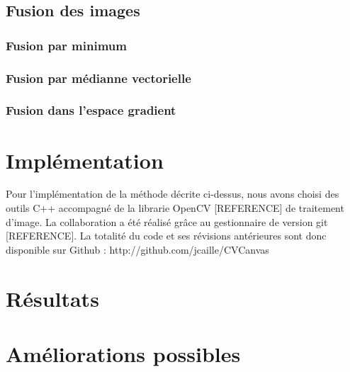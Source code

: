 \documentclass[12pt,a4paper]{article}
\begin{document}
\subsection{Fusion des images}

\subsubsection{Fusion par minimum}

\subsubsection{Fusion par médianne vectorielle}

\subsubsection{Fusion dans l'espace gradient}

\section{Implémentation}

Pour l'implémentation de la méthode décrite ci-dessus, nous avons choisi des outils C++ accompagné de la librarie OpenCV [REFERENCE] de traitement d'image. La collaboration a été réalisé grâce au gestionnaire de version git [REFERENCE]. La totalité du code et ses révisions antérieures sont donc disponible sur Github : http://github.com/jcaille/CVCanvas

\section{Résultats}

\section{Améliorations possibles}
\end{document}

